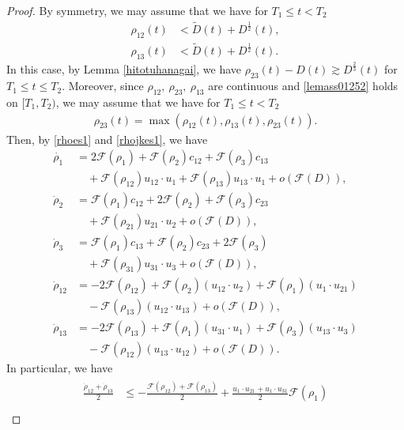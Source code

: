 \documentclass[reqno]{amsart}
\theoremstyle{plain}
\theoremstyle{definition}
\numberwithin{equation}{section}
\newcommand{\1}{\mathbbm{1}}
\begin{document}
\begin{proof}
By symmetry, we may assume that we have for $T_1\leq t<T_2$
\begin{align*}
\rho_{12}(t)&<\tilde{D}(t)+D^{\frac{1}{2}}(t),
\\
\rho_{13}(t)&<\tilde{D}(t)+D^{\frac{1}{2}}(t).
\end{align*}
In this case, by Lemma \ref{hitotuhanagai}, we have $\rho_{23}(t)-D(t)\gtrsim D^{\frac{2}{3}}(t)$ for $T_1\leq t\leq T_2$. Moreover, since $\rho_{12},\ \rho_{23},\ \rho_{13}$ are continuous and \eqref{lemass01252} holds on $[T_1,T_2)$, we may assume that we have for $T_1\leq t<T_2$
\begin{align*}
\rho_{23}(t)=\max{(\rho_{12}(t),\rho_{13}(t),\rho_{23}(t))}.
\end{align*}
Then, by \eqref{rhoes1} and \eqref{rhojkes1}, we have
\begin{align*}
\dot{\rho_1}&=2\mathcal{F}(\rho_1)+\mathcal{F}(\rho_2)c_{12}+\mathcal{F}(\rho_3)c_{13}
\\
&\quad+\mathcal{F}(\rho_{12})u_{12}\cdot u_1+\mathcal{F}(\rho_{13})u_{13}\cdot u_1+o\left(\mathcal{F}(D)\right),
\\
\dot{\rho}_2&=\mathcal{F}(\rho_1)c_{12}+2\mathcal{F}(\rho_2)+\mathcal{F}(\rho_3)c_{23}
\\
&\quad+\mathcal{F}(\rho_{21})u_{21}\cdot u_2+o\left(\mathcal{F}(D)\right),
\\
\dot{\rho}_3&=\mathcal{F}(\rho_{1})c_{13}+\mathcal{F}(\rho_2)c_{23}+2\mathcal{F}(\rho_3)
\\
&\quad+\mathcal{F}(\rho_{31})u_{31}\cdot u_3+o\left(\mathcal{F}(D)\right),
\\
\dot{\rho}_{12}&=-2\mathcal{F}(\rho_{12})+\mathcal{F}(\rho_2)(u_{12}\cdot u_2)+\mathcal{F}(\rho_1)(u_1\cdot u_{21})
\\
&\quad -\mathcal{F}(\rho_{13})(u_{12}\cdot u_{13})+o\left(\mathcal{F}(D)\right),
\\
\dot{\rho}_{13}&=-2\mathcal{F}(\rho_{13})+\mathcal{F}(\rho_1)(u_{31}\cdot u_1)+\mathcal{F}(\rho_3)(u_{13}\cdot u_3)
\\
&\quad-\mathcal{F}(\rho_{12})(u_{13}\cdot u_{12})+o\left(\mathcal{F}(D)\right).
\end{align*}
In particular, we have
\begin{align}\label{1213avees}
\begin{aligned}
\frac{\dot{\rho}_{12}+\dot{\rho}_{13}}{2}&\leq -\frac{\mathcal{F}(\rho_{12})+\mathcal{F}(\rho_{13})}{2}+\frac{u_1\cdot u_{21}+u_1\cdot u_{31}}{2}\mathcal{F}(\rho_1)
\\

\end{aligned}
\end{align}
\end{proof}
\end{document}
